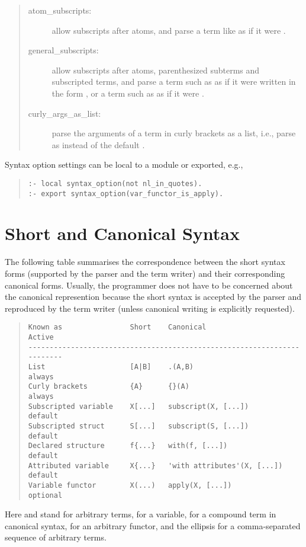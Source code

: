 \begin{quote}
\begin{description}
\item[atom_subscripts:] allow subscripts after atoms, and parse a term
    like  as if it were .
\item[general_subscripts:] allow subscripts after atoms, parenthesized
    subterms and subscripted terms, and parse a term
    such as  as if it were written in the form
    ,
    or a term such as  as if it were
    .
\item[curly_args_as_list:] parse the arguments of a term in curly
    brackets as a list, i.e., parse 
    as \notation{\{\}([a,b,c])} instead of the default .
\end{description}
\end{quote}
Syntax option  settings can be local to a module or exported, e.g.,
\begin{quote}
\begin{verbatim}
:- local syntax_option(not nl_in_quotes).
:- export syntax_option(var_functor_is_apply).
\end{verbatim}
\end{quote}

\section{Short and Canonical Syntax}

The following table summarises the correspondence between the short syntax
forms (supported by the parser and the term writer) and their corresponding
canonical forms. Usually, the programmer does not have to be concerned about
the canonical represention because the short syntax is accepted by the parser
and reproduced by the term writer (unless canonical writing is explicitly
requested).
\begin{quote}
\begin{verbatim}
Known as                Short    Canonical                    Active
------------------------------------------------------------------------
List                    [A|B]    .(A,B)                       always
Curly brackets          {A}      {}(A)                        always
Subscripted variable    X[...]   subscript(X, [...])          default
Subscripted struct      S[...]   subscript(S, [...])          default
Declared structure      f{...}   with(f, [...])               default
Attributed variable     X{...}   'with attributes'(X, [...])  default
Variable functor        X(...)   apply(X, [...])              optional
\end{verbatim}
\end{quote}
Here  and  stand for arbitrary terms,  for a
variable,  for a compound term in canonical syntax,  for
an arbitrary functor, and the ellipsis for a comma-separated sequence of
arbitrary terms.

